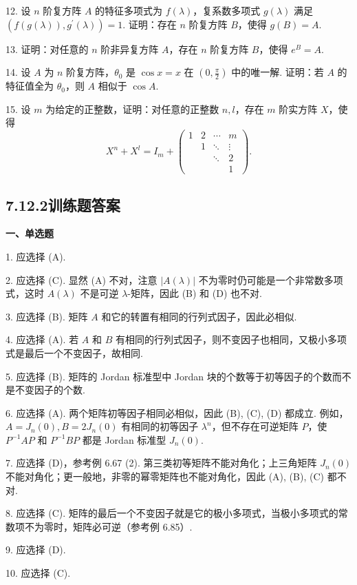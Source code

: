 \documentclass[UTF8,12pt,a4paper,fontset=fandol]{ctexart}
\begin{document}
12. 设 $n$ 阶复方阵 $A$ 的特征多项式为 $f(\lambda)$，复系数多项式 $g(\lambda)$ 满足 $(f(g(\lambda)),g^{\prime}(\lambda))=1$. 证明：存在 $n$ 阶复方阵 $B$，使得 $g(B)=A$.

13. 证明：对任意的 $n$ 阶非异复方阵 $A$，存在 $n$ 阶复方阵 $B$，使得 $e^B=A$.

14. 设 $A$ 为 $n$ 阶复方阵，$\theta_0$ 是 $\cos x=x$ 在 $(0,\frac{\pi}{2})$ 中的唯一解. 证明：若 $A$ 的特征值全为 $\theta_0$，则 $A$ 相似于 $\cos A$.

15. 设 $m$ 为给定的正整数，证明：对任意的正整数 $n,l$，存在 $m$ 阶实方阵 $X$，使得
\[
X^n+X^l=I_m+\left(\begin{array}{ccccc}
1&2&\cdots&m\\
&1&\ddots&\vdots\\
&&\ddots&2\\
&&&1
\end{array}\right).
\]

\subsection*{7.12.2\quad 训练题答案}

\noindent\textbf{一、单选题}

1. 应选择 (A).

2. 应选择 (C). 显然 (A) 不对，注意 $|A(\lambda)|$ 不为零时仍可能是一个非常数多项式，这时 $A(\lambda)$ 不是可逆 $\lambda$-矩阵，因此 (B) 和 (D) 也不对.

3. 应选择 (B). 矩阵 $A$ 和它的转置有相同的行列式因子，因此必相似.

4. 应选择 (A). 若 $A$ 和 $B$ 有相同的行列式因子，则不变因子也相同，又极小多项式是最后一个不变因子，故相同.

5. 应选择 (B). 矩阵的 Jordan 标准型中 Jordan 块的个数等于初等因子的个数而不是不变因子的个数.

6. 应选择 (A). 两个矩阵初等因子相同必相似，因此 (B), (C), (D) 都成立. 例如，$A=J_n(0),B=2J_n(0)$ 有相同的初等因子 $\lambda^n$，但不存在可逆矩阵 $P$，使 $P^{-1}AP$ 和 $P^{-1}BP$ 都是 Jordan 标准型 $J_n(0)$.

7. 应选择 (D)，参考例 6.67 (2). 第三类初等矩阵不能对角化；上三角矩阵 $J_n(0)$ 不能对角化；更一般地，非零的幂零矩阵也不能对角化，因此 (A), (B), (C) 都不对.

8. 应选择 (C). 矩阵的最后一个不变因子就是它的极小多项式，当极小多项式的常数项不为零时，矩阵必可逆（参考例 6.85）.

9. 应选择 (D).

10. 应选择 (C).
\end{document}
